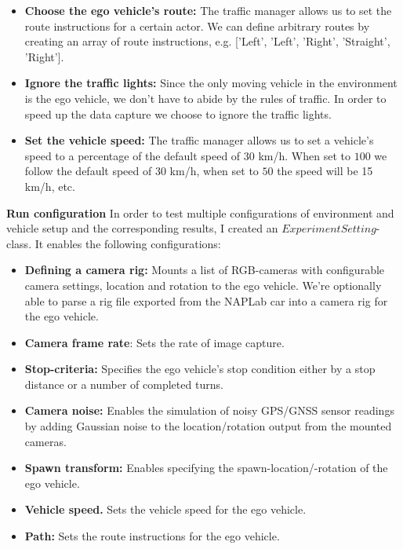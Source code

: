 \begin{itemize}
    \item \textbf{Choose the ego vehicle's route:} The traffic manager allows us to set the route instructions for a certain actor. We can define arbitrary routes by creating an array of route instructions, e.g. ['Left', 'Left', 'Right', 'Straight', 'Right'].
    \item \textbf{Ignore the traffic lights:} Since the only moving vehicle in the environment is the ego vehicle, we don't have to abide by the rules of traffic. In order to speed up the data capture we choose to ignore the traffic lights.
    \item \textbf{Set the vehicle speed:} The traffic manager allows us to set a vehicle's speed to a percentage of the default speed of 30 km/h. When set to $100$ we follow the default speed of 30 km/h, when set to $50$ the speed will be 15 km/h, etc.
\end{itemize}


\textbf{Run configuration}
In order to test multiple configurations of environment and vehicle setup and the corresponding results, I created an $ExperimentSetting$-class. It enables the following configurations:

\begin{itemize}
    \item \textbf{Defining a camera rig:} Mounts a list of RGB-cameras with configurable camera settings, location and rotation to the ego vehicle. We're optionally able to parse a rig file exported from the NAPLab car into a camera rig for the ego vehicle.
    \item \textbf{Camera frame rate}: Sets the rate of image capture.
    \item \textbf{Stop-criteria:} Specifies the ego vehicle's stop condition either by a stop distance or a number of completed turns.
    \item \textbf{Camera noise:} Enables the simulation of noisy GPS/GNSS sensor readings by adding Gaussian noise to the location/rotation output from the mounted cameras.
    \item \textbf{Spawn transform:} Enables specifying the spawn-location/-rotation of the ego vehicle.
    \item \textbf{Vehicle speed.} Sets the vehicle speed for the ego vehicle.
    \item \textbf{Path:} Sets the route instructions for the ego vehicle.
\end{itemize}


